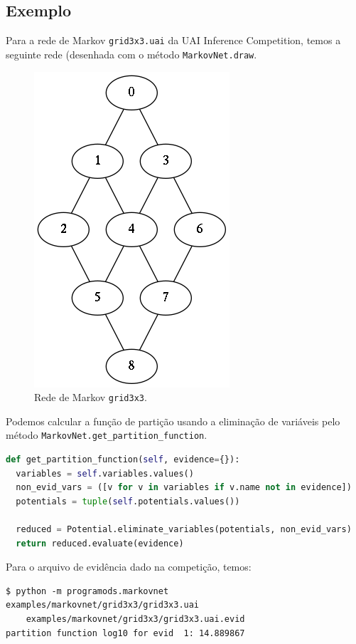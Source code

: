 \documentclass[paper=a4, fontsize=11pt]{scrartcl} %
\numberwithin{equation}{subsection}
\numberwithin{figure}{subsection}
\numberwithin{table}{subsection}
\numberwithin{definition}{subsection}
\numberwithin{theorem}{subsection}
\numberwithin{property}{subsection}
\numberwithin{proposition}{subsection}
\numberwithin{equation}{section}
\numberwithin{figure}{section}
\numberwithin{table}{section}
\numberwithin{definition}{section}
\numberwithin{theorem}{section}
\numberwithin{property}{section}
\numberwithin{proposition}{section}
\begin{document}
\subsection{Exemplo}

Para a rede de Markov \verb|grid3x3.uai| da UAI Inference Competition, temos a seguinte rede (desenhada com o método \verb|MarkovNet.draw|.

\begin{figure}[hbtp]
\centering
\includegraphics[scale=0.7]{images/grid3x3.png}
\caption{Rede de Markov \texttt{grid3x3}.}
\label{fig:alcanc}
\end{figure}


Podemos calcular a função de partição usando a eliminação de variáveis pelo método \verb|MarkovNet.get_partition_function|.

\begin{lstlisting}[language=python]
def get_partition_function(self, evidence={}):
  variables = self.variables.values()
  non_evid_vars = ([v for v in variables if v.name not in evidence])
  potentials = tuple(self.potentials.values())

  reduced = Potential.eliminate_variables(potentials, non_evid_vars)
  return reduced.evaluate(evidence)
\end{lstlisting}

Para o arquivo de evidência dado na competição, temos:
\begin{verbatim}
$ python -m programods.markovnet examples/markovnet/grid3x3/grid3x3.uai 
    examples/markovnet/grid3x3/grid3x3.uai.evid 
partition function log10 for evid  1: 14.889867
\end{verbatim}
\end{document}
